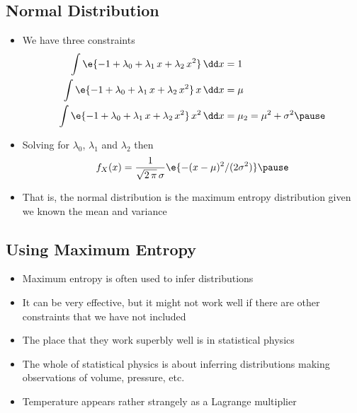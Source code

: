 
\begin{slide}
\section[-2]{Normal Distribution}
  
\begin{PauseHighLight}\small
  \begin{itemize}
  \item We have three constraints
    \begin{align*}
      \int \e{-1 + \lambda_0 + \lambda_1\, x + \lambda_2\, x^2} \,\dd x &= 1
      \\
      \int \e{-1 + \lambda_0 + \lambda_1\, x + \lambda_2\, x^2} \,x\, \dd x
                                                                        &= \mu \\
      \int \e{-1 + \lambda_0 + \lambda_1\, x + \lambda_2\, x^2} \,x^2\, \dd
      x &= \mu_2 =  \mu^2 + \sigma^2\pause
    \end{align*}
  \item Solving for $\lambda_0$, $\lambda_1$ and $\lambda_2$ then
     \begin{align*}
       f_X(x) = \frac{1}{\sqrt{2\,\pi}\, \sigma} \e{-(x-\mu)^2/(2\sigma^2)}\pause
     \end{align*}
   \item That is, the normal distribution is the maximum entropy
     distribution given we known the mean and variance\pause
  \end{itemize}
\end{PauseHighLight}

\end{slide}


\begin{slide}
\section{Using Maximum Entropy}

\begin{PauseHighLight}
  \begin{itemize}
  \item Maximum entropy is often used to infer distributions\pause
  \item It can be very effective, but it might not work well if there are
    other constraints that we have not included\pause
  \item The place that they work superbly well is in statistical
    physics\pause
  \item The whole of statistical physics is about inferring
    distributions making observations of volume, pressure, etc.\pause
  \item Temperature appears rather strangely as a Lagrange multiplier\pause
  \end{itemize}
\end{PauseHighLight}

\end{slide}

